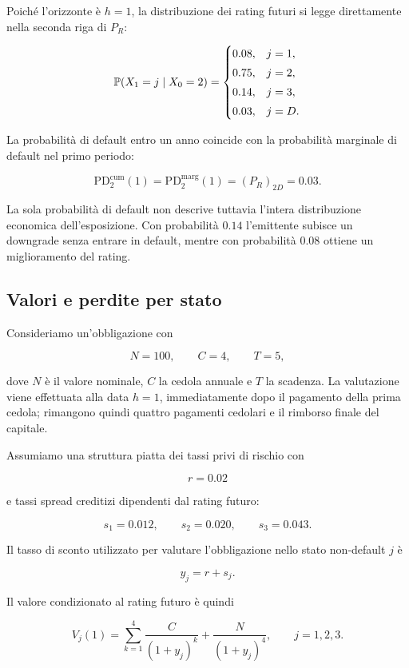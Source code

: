 Poich\'{e} l'orizzonte \`{e} $h=1$, la distribuzione dei rating futuri
si legge direttamente nella seconda riga di $P_R$:

\[
\mathbb{P}(X_1=j\mid X_0=2)
=
\begin{cases}
0.08, & j=1,\\[1mm]
0.75, & j=2,\\[1mm]
0.14, & j=3,\\[1mm]
0.03, & j=D.
\end{cases}
\]

La probabilit\`{a} di default entro un anno coincide con la
probabilit\`{a} marginale di default nel primo periodo:

\[
\mathrm{PD}_{2}^{\mathrm{cum}}(1)
=
\mathrm{PD}_{2}^{\mathrm{marg}}(1)
=
(P_R)_{2D}
=
0.03.
\]

La sola probabilit\`{a} di default non descrive tuttavia l'intera
distribuzione economica dell'esposizione. Con probabilit\`{a} $0.14$
l'emittente subisce un downgrade senza entrare in default, mentre con
probabilit\`{a} $0.08$ ottiene un miglioramento del rating.

\subsection{Valori e perdite per stato}

\label{subsec:cap9-applicazione-valori-perdite}

Consideriamo un'obbligazione con

\[
N=100,
\qquad
C=4,
\qquad
T=5,
\]

dove $N$ \`{e} il valore nominale, $C$ la cedola annuale e $T$ la
scadenza. La valutazione viene effettuata alla data $h=1$,
immediatamente dopo il pagamento della prima cedola; rimangono quindi
quattro pagamenti cedolari e il rimborso finale del capitale.

Assumiamo una struttura piatta dei tassi privi di rischio con

\[
r=0.02
\]

e tassi spread creditizi dipendenti dal rating futuro:

\[
s_1=0.012,
\qquad
s_2=0.020,
\qquad
s_3=0.043.
\]

Il tasso di sconto utilizzato per valutare l'obbligazione nello stato
non-default $j$ \`{e}

\[
y_j=r+s_j.
\]

Il valore condizionato al rating futuro \`{e} quindi

\[
V_j(1)
=
\sum_{k=1}^{4}
\frac{C}{(1+y_j)^k}
+
\frac{N}{(1+y_j)^4},
\qquad
j=1,2,3.
\]

